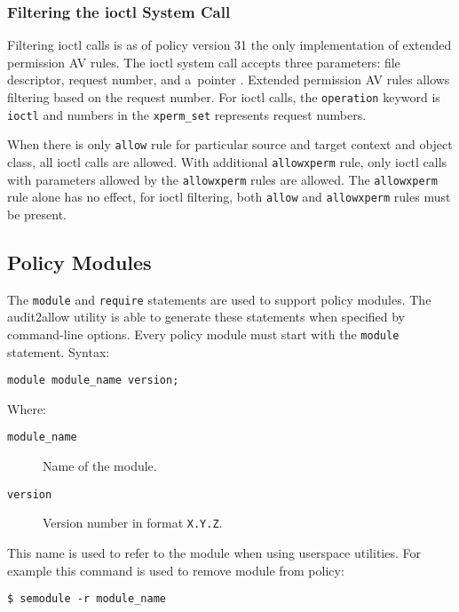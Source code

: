 \subsubsection{Filtering the ioctl System Call}
Filtering ioctl calls is as of policy version 31 the only implementation of
extended permission AV rules. The ioctl system call accepts three parameters:
file descriptor, request number, and a~pointer \cite{ioctl}. Extended permission
AV rules allows filtering based on the request number. For ioctl calls, the
\texttt{operation} keyword is \texttt{ioctl} and numbers in the
\texttt{xperm\_set} represents request numbers.

When there is only \texttt{allow} rule for particular source and target context
and object class, all ioctl calls are allowed. With additional
\texttt{allowxperm} rule, only ioctl calls with parameters allowed by the
\texttt{allowxperm} rules are allowed. The \texttt{allowxperm} rule alone has
no effect, for ioctl filtering, both \texttt{allow} and \texttt{allowxperm}
rules must be present.

\subsection{Policy Modules}
\label{modules}

The \texttt{module} and \texttt{require} statements are used to support policy
modules. The audit2allow utility is able to generate these statements when
specified by command-line options. Every policy module must start with the
\texttt{module} statement. Syntax:
\begin{lstlisting}[language=te]
module module_name version;
\end{lstlisting}
Where:
\begin{description}
    \item [\texttt{module\_name}] Name of the module.
    \item [\texttt{version}] Version number in format \texttt{X.Y.Z}.
\end{description}
This name is used to refer to the module when using userspace utilities. For
example this command is used to remove module from policy:
\begin{lstlisting}
$ semodule -r module_name
\end{lstlisting}

